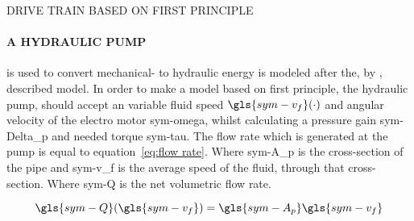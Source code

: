 \begin{RoyalFigure}[!htb, label=fig:propulsionsystemmodel]{DRIVE TRAIN BASED ON FIRST PRINCIPLE}
\end{RoyalFigure}
\newpage

\paragraph{A HYDRAULIC PUMP} is used to convert mechanical- to hydraulic energy is modeled after the, by
\citet{mathworks_mechanical_hydraulic_2016}, described model. In order to make a model based on first principle, the
hydraulic pump, should accept an variable fluid speed \( \gls{sym-v_f}(\cdot) \) and angular velocity of the electro
motor \gls{sym-omega}, whilst calculating a pressure gain \gls{sym-Delta_p} and needed torque \gls{sym-tau}. The flow
rate which is generated at the pump is equal to equation~\ref{eq:flow rate}. Where \gls{sym-A_p} is the cross-section of
the pipe and \gls{sym-v_f} is the average speed of the fluid, through that cross-section. Where \gls{sym-Q} is the net
volumetric flow rate.

\begin{equation}\label{eq:flow rate}
	\gls{sym-Q}(\gls{sym-v_f}) = \gls{sym-A_p} \gls{sym-v_f}
\end{equation}

